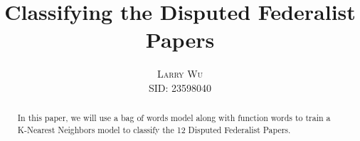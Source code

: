 \documentclass[twoside]{article}
\title{\vspace{-15mm}\fontsize{24pt}{10pt}\selectfont\textbf{Classifying the Disputed Federalist Papers}} %
\author{
\large
\textsc{Larry Wu}\\%
\normalsize SID: 23598040 \\ %
\vspace{-5mm}
}
\date{}
\begin{document}
\maketitle %

\thispagestyle{fancy} %


\begin{abstract}

\noindent In this paper, we will use a bag of words model along with function words to train a K-Nearest Neighbors model to classify the 12 Disputed Federalist Papers.

\end{abstract}

\end{document}
